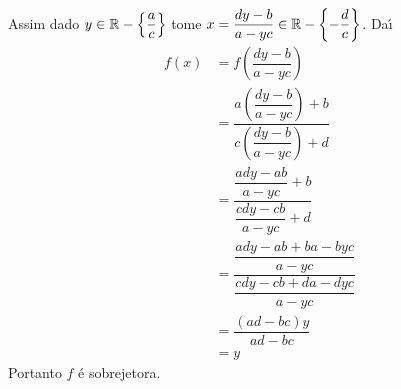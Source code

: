 \documentclass[12pt]{article}
\begin{document}
Assim dado $y \in  \mathbb{R} - \left\{\dfrac{a}{c}\right\}$ tome $x = \dfrac{dy - b}{a - yc} \in \mathbb{R} - \left\{-\dfrac{d}{c}\right\}$. Da{\'\i}
\begin{align*}
	f(x) &= f\left(\dfrac{dy - b}{a - yc}\right) \\
	&= \dfrac{a\left(\dfrac{dy - b}{a - yc}\right) + b}{c\left(\dfrac{dy - b}{a - yc}\right) + d} \\
	&= \dfrac{\dfrac{ady - ab}{a - yc} + b}{\dfrac{cdy - cb}{a - yc} + d} \\
	&= \dfrac{\dfrac{ady - ab + ba - byc}{a - yc}}{\dfrac{cdy - cb + da - dyc}{a - yc}} \\
	&= \dfrac{(ad - bc)y}{ad - bc} \\ 
	&= y
\end{align*}
Portanto $f$ \'e sobrejetora.
\end{document}
